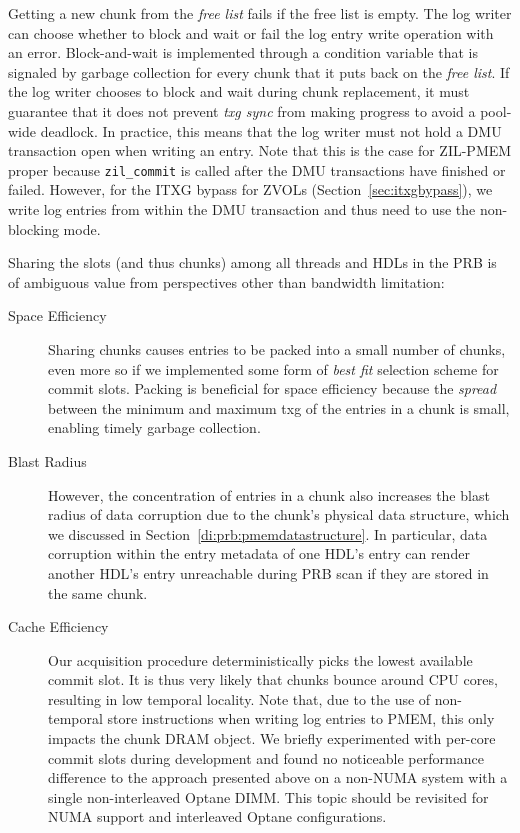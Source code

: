 \documentclass[12pt,a4paper,twoside]{book}
\begin{document}
{Getting a new chunk from the \textit{free list} fails if the free list is empty.
The log writer can choose whether to block and wait or fail the log entry write operation with an error.
Block-and-wait is implemented through a condition variable that is signaled by garbage collection for every chunk that it puts back on the \textit{free list}.
If the log writer chooses to block and wait during chunk replacement, it must guarantee that it does not prevent \textit{txg sync} from making progress to avoid a pool-wide deadlock.
In practice, this means that the log writer must not hold a DMU transaction open when writing an entry.
Note that this is the case for ZIL-PMEM proper because \lstinline{zil_commit} is called after the DMU transactions have finished or failed.
However, for the ITXG bypass for ZVOLs (Section~\ref{sec:itxgbypass}), we write log entries from within the DMU transaction and thus need to use the non-blocking mode.

Sharing the slots (and thus chunks) among all threads and HDLs in the PRB is of ambiguous value from perspectives other than bandwidth limitation:
\begin{description}
    \item[Space Efficiency]
        Sharing chunks causes entries to be packed into a small number of chunks, even more so if we implemented some form of \textit{best fit} selection scheme for commit slots.
        Packing is beneficial for space efficiency because the \textit{spread} between the minimum and maximum txg of the entries in a chunk is small, enabling timely garbage collection.
    \item[Blast Radius]
        However, the concentration of entries in a chunk also increases the blast radius of data corruption due to the chunk's physical data structure, which we discussed in Section~\ref{di:prb:pmemdatastructure}.
        In particular, data corruption within the entry metadata of one HDL's entry can render another HDL's entry unreachable during PRB scan if they are stored in the same chunk.
    \item[Cache Efficiency] Our acquisition procedure deterministically picks the lowest available commit slot.
        It is thus very likely that chunks bounce around CPU cores, resulting in low temporal locality.
        Note that, due to the use of non-temporal store instructions when writing log entries to PMEM, this only impacts the chunk DRAM object.
        We briefly experimented with per-core commit slots during development and found no noticeable performance difference to the approach presented above on a non-NUMA system with a single non-interleaved Optane DIMM.
        This topic should be revisited for NUMA support and interleaved Optane configurations.
\end{description}

}
\end{document}
